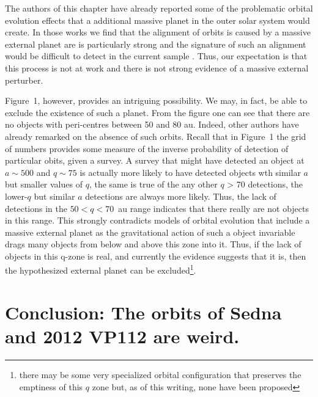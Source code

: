 \documentclass{aastex62}
\begin{document}
The authors of this chapter have already reported some of the problematic orbital evolution effects that a additional massive planet in the outer solar system would create.  In  those works we find that the alignment of orbits is caused by a massive external planet are is particularly strong \citep{shankman17}  and the signature of such an alignment would be difficult to detect in the current sample \citep{lawler17}.  Thus, our expectation is that this process is not at work and there is not strong evidence of a massive external perturber.

Figure~1, however, provides an intriguing possibility.  We may, in fact, be able to exclude the existence of such a planet. From the figure one can see that there are no objects with peri-centres between 50 and 80 au.  Indeed, other authors have already remarked on the absence of such orbits.  Recall that in Figure~1 the grid of numbers provides some measure of the inverse probability of detection of particular obits, given a survey.  A survey that might have detected an object at $a \sim 500$ and $q \sim75$ is actually more likely to have detected objects wth similar $a$ but smaller values of $q$, the same is true of the any other $q$ > 70 detections, the lower-$q$ but similar $a$ detections are always more likely.  Thus, the lack of detections in the $50 < q < 70$~au range indicates that there really are not objects in this range.  This strongly contradicts models of orbital evolution that include a massive external planet as the gravitational action of such a object invariable drags many objects from below and above this zone into it.  Thus, if the lack of objects in this q-zone is real, and currently the evidence suggests that it is, then the hypothesized external planet can be excluded\footnote{there may be some very specialized orbital configuration that preserves the emptiness of this  $q$ zone but, as of this writing, none have been proposed}.


\section{Conclusion: The orbits of Sedna and 2012 VP112 are weird.}


% 



\end{document}
